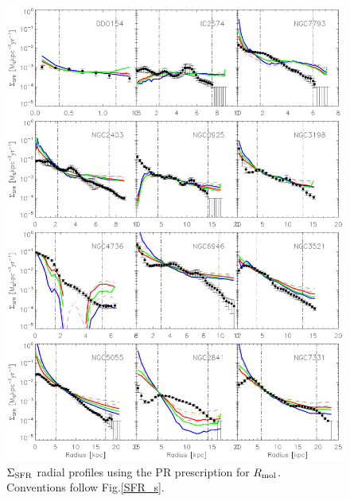 \documentclass[12pt,preprint]{aastex}
\begin{document}
\begin{figure}
\begin{center}
\includegraphics[scale=0.8]{SFR_p.eps}  \caption{$\Sigma_{\rm SFR}$ radial profiles using the PR prescription for $R_{\rm mol}$. Conventions follow Fig.\ref{SFR_s}. }
\label{SFR_p}
\end{center}
\end{figure}
\end{document}

